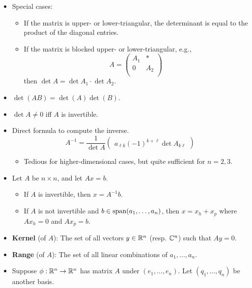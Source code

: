\documentclass[../notes.tex]{subfiles}
\begin{document}
\begin{itemize}
    \item Special cases:
    \begin{itemize}
        \item If the matrix is upper- or lower-triangular, the determinant is equal to the product of the diagonal entries.
        \item If the matrix is blocked upper- or lower-triangular, e.g.,
        \begin{equation*}
            A =
            \begin{pmatrix}
                A_1 & *\\
                0 & A_2\\
            \end{pmatrix}
        \end{equation*}
        then $\det A=\det A_1\cdot\det A_2$.
    \end{itemize}
    \item $\det(AB)=\det(A)\det(B)$.
    \item $\det A\neq 0$ iff $A$ is invertible.
    \item Direct formula to compute the inverse.
    \begin{equation*}
        A^{-1} = \frac{1}{\det A}
        \begin{pmatrix}
            a_{\ell k}(-1)^{k+\ell}\det A_{k\ell}
        \end{pmatrix}
    \end{equation*}
    \begin{itemize}
        \item Tedious for higher-dimensional cases, but quite sufficient for $n=2,3$.
    \end{itemize}
    \item Let $A$ be $n\times n$, and let $Ax=b$.
    \begin{itemize}
        \item If $A$ is invertible, then $x=A^{-1}b$.
        \item If $A$ is not invertible and $b\in\operatorname{span}(a_1,\dots,a_n)$, then $x=x_h+x_p$ where $Ax_h=0$ and $Ax_p=b$.
    \end{itemize}
    \item \textbf{Kernel} (of $A$): The set of all vectors $y\in\mathbb{R}^n$ (resp. $\mathbb{C}^n$) such that $Ay=0$.
    \item \textbf{Range} (of $A$): The set of all linear combinations of $a_1,\dots,a_n$.
    \item Suppose $\phi:\mathbb{R}^n\to\mathbb{R}^n$ has matrix $A$ under $(e_1,\dots,e_n)$. Let $(q_1,\dots,q_n)$ be another basis.

\end{itemize}
\end{document}
